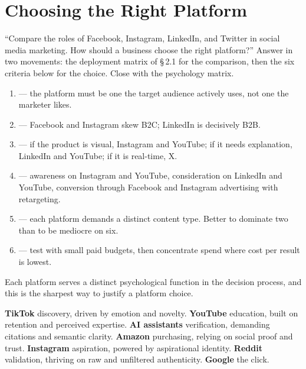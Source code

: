 \documentclass{MMTextbook}
\begin{document}
\section{Choosing the Right Platform}

\begin{exambox}
``Compare the roles of Facebook, Instagram, LinkedIn, and Twitter in social
media marketing. How should a business choose the right platform?''
Answer in two movements: the deployment matrix of \S\,2.1 for the comparison,
then the six criteria below for the choice. Close with the psychology matrix.
\end{exambox}

\begin{enumerate}
\item {} --- the platform must be one the target
      audience actively uses, not one the marketer likes.
\item {} --- Facebook and Instagram skew B2C; LinkedIn is
      decisively B2B.
\item {} --- if the product is visual, Instagram
      and YouTube; if it needs explanation, LinkedIn and YouTube; if it is
      real-time, X.
\item {} --- awareness on Instagram and YouTube,
      consideration on LinkedIn and YouTube, conversion through Facebook and
      Instagram advertising with retargeting.
\item {} --- each platform demands a distinct content type. Better
      to dominate two than to be mediocre on six.
\item {} --- test with small paid budgets, then concentrate
      spend where cost per result is lowest.
\end{enumerate}

\begin{keybox}
Each platform serves a distinct psychological function in the decision process,
and this is the sharpest way to justify a platform choice.

\smallskip
\textbf{TikTok} \ra{} discovery, driven by emotion and novelty. \quad
\textbf{YouTube} \ra{} education, built on retention and perceived expertise.
\quad \textbf{AI assistants} \ra{} verification, demanding citations and
semantic clarity. \quad \textbf{Amazon} \ra{} purchasing, relying on social
proof and trust. \quad \textbf{Instagram} \ra{} aspiration, powered by
aspirational identity. \quad \textbf{Reddit} \ra{} validation, thriving on raw
and unfiltered authenticity. \quad \textbf{Google} \ra{} the click.
\end{keybox}
\end{document}
